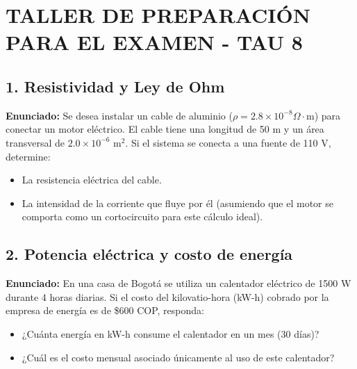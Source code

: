 \documentclass[12pt, letterpaper]{article}
\begin{document}
\section*{TALLER DE PREPARACIÓN PARA EL EXAMEN - TAU 8}

\subsection*{1. Resistividad y Ley de Ohm}
\noindent \textbf{Enunciado:} Se desea instalar un cable de aluminio ($\rho = 2.8 \times 10^{-8} \Omega \cdot \text{m}$) para conectar un motor eléctrico. El cable tiene una longitud de 50 m y un área transversal de $2.0 \times 10^{-6} \text{ m}^2$. Si el sistema se conecta a una fuente de 110 V, determine:
\begin{itemize}
	\item[a.] La resistencia eléctrica del cable.
	\item[b.] La intensidad de la corriente que fluye por él (asumiendo que el motor se comporta como un cortocircuito para este cálculo ideal).
\end{itemize}


\subsection*{2. Potencia eléctrica y costo de energía}
\noindent \textbf{Enunciado:} En una casa de Bogotá se utiliza un calentador eléctrico de 1500 W durante 4 horas diarias. Si el costo del kilovatio-hora (kW-h) cobrado por la empresa de energía es de \$600 COP, responda:
\begin{itemize}
	\item[a.] ¿Cuánta energía en kW-h consume el calentador en un mes (30 días)?
	\item[b.] ¿Cuál es el costo mensual asociado únicamente al uso de este calentador?
\end{itemize}
\end{document}
